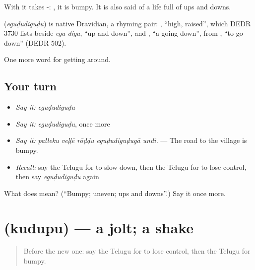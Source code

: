 With  it takes -:  , it is bumpy. It is also said of a life full of ups and downs.

\begin{cousinweb}
\textbf{} (\emph{eguḍudiguḍu}) is native Dravidian, a rhyming pair: , \textquotedblleft{}high, raised\textquotedblright{}, which DEDR 3730 lists beside \emph{ega diga}, \textquotedblleft{}up and down\textquotedblright{}, and , \textquotedblleft{}a going down\textquotedblright{}, from , \textquotedblleft{}to go down\textquotedblright{} (DEDR 502).
\end{cousinweb}

\begin{grammarlens}[title={What you've built}]
One more word for getting around.
\end{grammarlens}

\subsection*{Your turn}
\begin{itemize}
\raggedright
  \item \emph{Say it:} \emph{eguḍudiguḍu}
  \item \emph{Say it:} \emph{eguḍudiguḍu}, once more
  \item \emph{Say it:} \emph{palleku veḷḷē rōḍḍu eguḍudiguḍugā undi.} — The road to the village is bumpy.
  \item \emph{Recall:} say the Telugu for to slow down, then the Telugu for to lose control, then say \emph{eguḍudiguḍu} again
\end{itemize}

\begin{tcolorbox}[breakable,colback=teal!4,colframe=teal!35!black,title={Before you move on}]
What does  mean? (\textquotedblleft{}Bumpy; uneven; ups and downs\textquotedblright{}.) Say it once more.
\end{tcolorbox}
\section[\texorpdfstring{\te{కుదుపు} (kudupu)}{కుదుపు (kudupu)}]{ (kudupu) — a jolt; a shake}

\label{lesson:TE-C446-kudupu}



\begin{quote}
Before the new one: say the Telugu for to lose control, then the Telugu for bumpy.
\end{quote}

